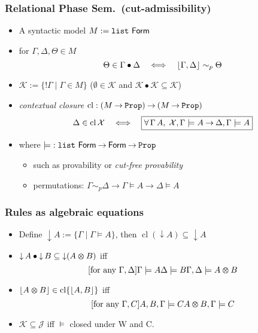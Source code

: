 \documentclass[xcolor=pdftex,graphicx=pdftex,12pt]{beamer}
\renewcommand\frule[1]{\ensuremath{\langle#1\rangle}}
\newcommand{\coq}[1]{\ensuremath{\mathalpha{\mathtt{#1}}}}
\newcommand{\cfun}{\mathbin{\rightarrow}}
\newcommand{\Prop}{\coq{Prop}}
\newcommand{\cdef}{\mathrel{\mathtt{:=}}}
\renewcommand{\iff}{\mathrel\Longleftrightarrow}
\newcommand{\ltime}{\mathbin{\varotimes}}
\newcommand{\lbang}{\mathop{!}}
\newcommand{\cperm}{\mathrel{\sim_p}}
\newcommand{\cl}{\mathop{\mathrm{cl}}}
\newcommand{\mmult}{\mathbin{\bullet}}
\newcommand{\set}[1]{\mathcal{#1}}
\newcommand{\pable}{\mathrel{\models}}
\begin{document}
\begin{frame}

\frametitle{Relational Phase Sem.\ (cut-admissibility)}


\begin{itemize}
\item A syntactic model  $M\cdef \coq{list}~\mathsf{Form}$
\item for $\Gamma,\Delta,\Theta\in M$
$$\Theta\in \Gamma\mmult \Delta \quad\iff\quad\ulist{\Gamma,\Delta}\cperm\Theta$$
\item $\set K\cdef \{\lbang\Gamma\mid\Gamma\in M\}$ ($\emptyset\in\set K$ and $\set K\mmult\set K\subseteq\set K$)
\item \emph{contextual closure}  $\cl: (M\cfun\Prop)\cfun (M\cfun\Prop)$ 
$$\Delta\in\cl\set X\quad\iff\quad \fbox{$\forall\,\Gamma\,A,\;\set X,\Gamma\pable A\cfun \Delta,\Gamma\pable A$}$$ 
\item where ${\pable}:\coq{list}~\mathsf{Form}\cfun\mathsf{Form}\cfun\Prop$
  \begin{itemize}
  \item such as provability or \emph{cut-free provability}
  \item permutations: $\Gamma\cperm\Delta\cfun \Gamma\pable A\cfun \Delta\pable A$
  \end{itemize}
\end{itemize}

\end{frame}

\newcommand{\dc}{\mathop{\downarrow}}
\renewcommand\frule[1]{#1}


\begin{frame}

\frametitle{Rules as algebraic equations}

\begin{itemize}

\item Define $\dc A\cdef \{\Gamma\mid \Gamma\pable A\}$, then $\cl(\dc A)\subseteq \dc A$ 
\item $\dc A\mmult\dc B\subseteq \dc(A\ltime B)$ iff 
$$
\infer2[\text{for any $\Gamma,\Delta$}]   {\Gamma \pable A}{\Delta \pable B}
                      {\Gamma, \Delta \pable A \ltime B}$$
\item $\ulist{A\ltime B}\in\cl\{\ulist{A,B}\}$ iff
$$
\infer1[\text{for any $\Gamma,C$}]   {A,B,\Gamma \pable C} 
                      { A \ltime B, \Gamma\pable C}$$
\item $\set K\subseteq\set J$ iff $\pable$ closed under \frule W and \frule C.
\end{itemize}

\end{frame}
\end{document}

